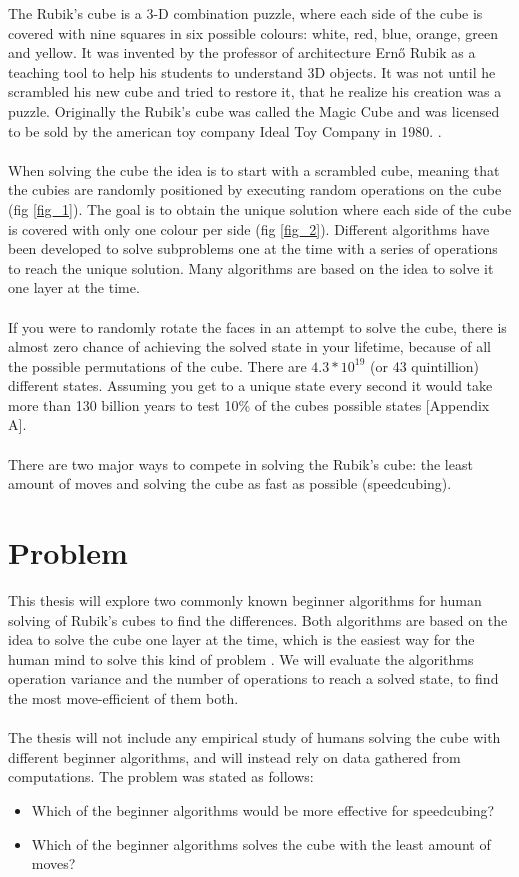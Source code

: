 \documentclass[a4paper,11pt]{kth-mag}
\begin{document}
The Rubik’s cube is a 3-D combination puzzle, where each side of the cube is covered with nine squares in six possible colours: white, red, blue, orange, green and yellow. It was invented by the professor of architecture Ernő Rubik as a teaching tool to help his students to understand 3D objects. It was not until he scrambled his new cube and tried to restore it, that he realize his creation was a puzzle. Originally the Rubik's cube was called the Magic Cube and was licensed to be sold by the american toy company Ideal Toy Company in 1980. \cite{Rubiks}.\\\\
When solving the cube the idea is to start with a scrambled cube, meaning that the cubies are randomly positioned by executing random operations on the cube (fig \ref{fig_1}). The goal is to obtain the unique solution where each side of the cube is covered with only one colour per side (fig \ref{fig_2}). Different algorithms have been developed to solve subproblems one at the time with a series of operations to reach the unique solution. Many algorithms are based on the idea to solve it one layer at the time.\\\\
If you were to randomly rotate the faces in an attempt to solve the cube, there is almost zero chance of achieving the solved state in your lifetime, because of all the possible permutations of the cube. There are $4.3 * 10^{19}$ (or 43 quintillion) \cite{Faculty} different states. Assuming you get to a unique state every second it would take more than 130 billion years to test 10\% of the cubes possible states [Appendix A].\\\\
There are two major ways to compete in solving the Rubik’s cube: the least amount of moves and solving the cube as fast as possible (speedcubing).

\section{Problem}
This thesis will explore two commonly known beginner algorithms for human solving of Rubik’s cubes to find the differences. Both algorithms are based on the idea to solve the cube one layer at the time, which is the easiest way for the human mind to solve this kind of problem \cite{Lar5}. We will evaluate the algorithms operation variance and the number of operations to reach a solved state, to find the most move-efficient of them both.\\\\
The thesis will not include any empirical study of humans solving the cube with different beginner algorithms, and will instead rely on data gathered from computations.
The problem was stated as follows:
\begin{itemize}
\item[] Which of the beginner algorithms would be more effective for speedcubing?
\item[] Which of the beginner algorithms solves the cube with the least amount of moves?
\end{itemize}
\end{document}
